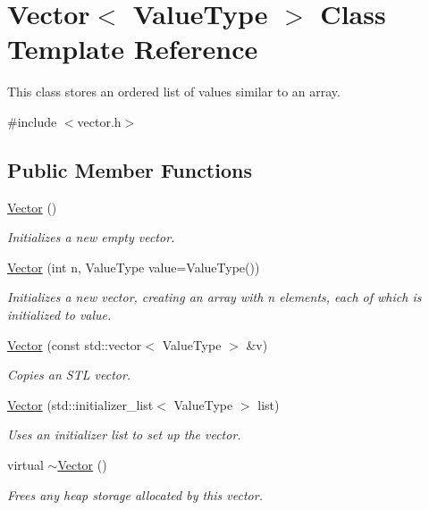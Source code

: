 \hypertarget{classVector}{}\section{Vector$<$ Value\+Type $>$ Class Template Reference}
\label{classVector}


This class stores an ordered list of values similar to an array.  




{\ttfamily \#include $<$vector.\+h$>$}

\subsection*{Public Member Functions}
\begin{DoxyCompactItemize}
\item 
\mbox{\hyperlink{classVector_a4df026156780bc0ca651c342b7d6daa4}{Vector}} ()
\begin{DoxyCompactList}\small\item\em Initializes a new empty vector. \end{DoxyCompactList}\item 
\mbox{\hyperlink{classVector_abf5f4a6c2e8f722dfaed5c07027a84ac}{Vector}} (int n, Value\+Type value=Value\+Type())
\begin{DoxyCompactList}\small\item\em Initializes a new vector, creating an array with {\ttfamily n} elements, each of which is initialized to {\ttfamily value}. \end{DoxyCompactList}\item 
\mbox{\hyperlink{classVector_ad8177d3d1655065dba30a05eb3412843}{Vector}} (const std\+::vector$<$ Value\+Type $>$ \&v)
\begin{DoxyCompactList}\small\item\em Copies an S\+TL vector. \end{DoxyCompactList}\item 
\mbox{\hyperlink{classVector_a81ccc7dac38b6bdeca04281b1acb39c0}{Vector}} (std\+::initializer\+\_\+list$<$ Value\+Type $>$ list)
\begin{DoxyCompactList}\small\item\em Uses an initializer list to set up the vector. \end{DoxyCompactList}\item 
virtual \mbox{\hyperlink{classVector_aaa9fccd0cb7734271f7a15e5d9dc0d27}{$\sim$\+Vector}} ()
\begin{DoxyCompactList}\small\item\em Frees any heap storage allocated by this vector. \end{DoxyCompactList}\item 

\end{DoxyCompactItemize}

